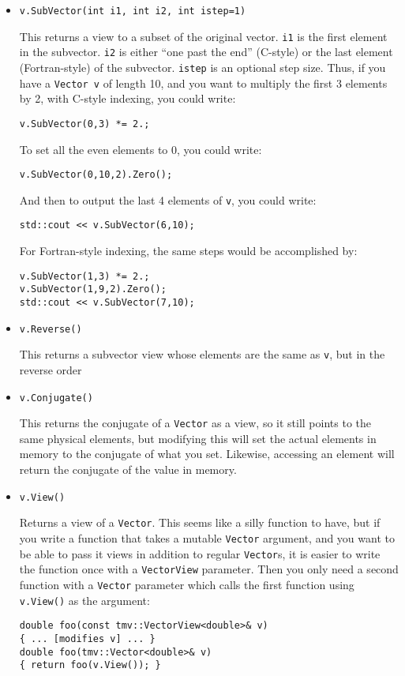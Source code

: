 \documentclass[twoside,letterpaper,11pt]{article}
\renewcommand{\tt}[1]{{\texttt {#1}}}
\begin{document}
\begin{itemize}
\item
\begin{verbatim}
v.SubVector(int i1, int i2, int istep=1)
\end{verbatim}
This returns a view to a subset of the original vector.
\tt{i1} is the first element in the subvector.
\tt{i2} is either ``one past the end'' (C-style) or the last element
(Fortran-style) of the subvector.
\tt{istep} is an optional step size.
Thus, if you have a \tt{Vector~v} of length 10, and you want to
multiply the first 3 elements by 2, with C-style indexing, you could write:
\begin{verbatim}
v.SubVector(0,3) *= 2.;
\end{verbatim}
To set all the even elements to 0, you could write:
\begin{verbatim}
v.SubVector(0,10,2).Zero();
\end{verbatim}
And then to output the last 4 elements of \tt{v}, you could write:
\begin{verbatim}
std::cout << v.SubVector(6,10);
\end{verbatim}

For Fortran-style indexing, the same steps would be accomplished by:
\begin{verbatim}
v.SubVector(1,3) *= 2.;
v.SubVector(1,9,2).Zero();
std::cout << v.SubVector(7,10);
\end{verbatim}

\item
\begin{verbatim}
v.Reverse()
\end{verbatim}
This returns a subvector view whose elements are the same as \tt{v},
but in the reverse order

\item
\begin{verbatim}
v.Conjugate()
\end{verbatim}
This returns the conjugate of a \tt{Vector} as a view, so it still points
to the same physical elements, but modifying this will set the 
actual elements in memory to the conjugate of what you set.  Likewise,
accessing an element will return the conjugate of the value in memory.

\item
\begin{verbatim}
v.View()
\end{verbatim}
Returns a view of a \tt{Vector}.  This seems like a silly function to have, but
if you write a function that takes a mutable \tt{Vector} argument, and you want to
be able to pass it views in addition to regular \tt{Vector}s, it is easier to write the 
function once with a \tt{VectorView} parameter.  Then you only need a second 
function with a \tt{Vector} parameter which calls the first function
using \tt{v.View()} as the argument:
\begin{verbatim}
double foo(const tmv::VectorView<double>& v)
{ ... [modifies v] ... }
double foo(tmv::Vector<double>& v)
{ return foo(v.View()); }
\end{verbatim}


\end{itemize}
\end{document}
